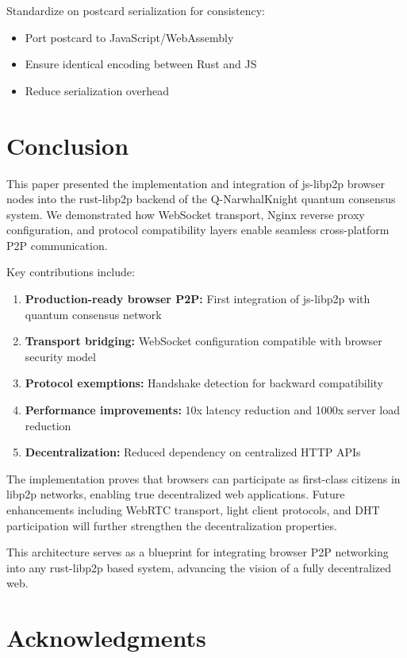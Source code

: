 \documentclass[11pt,a4paper]{article}
\begin{document}
Standardize on postcard serialization for consistency:

\begin{itemize}
    \item Port postcard to JavaScript/WebAssembly
    \item Ensure identical encoding between Rust and JS
    \item Reduce serialization overhead
\end{itemize}

\section{Conclusion}

This paper presented the implementation and integration of js-libp2p browser nodes into the rust-libp2p backend of the Q-NarwhalKnight quantum consensus system. We demonstrated how WebSocket transport, Nginx reverse proxy configuration, and protocol compatibility layers enable seamless cross-platform P2P communication.

Key contributions include:

\begin{enumerate}
    \item \textbf{Production-ready browser P2P:} First integration of js-libp2p with quantum consensus network
    \item \textbf{Transport bridging:} WebSocket configuration compatible with browser security model
    \item \textbf{Protocol exemptions:} Handshake detection for backward compatibility
    \item \textbf{Performance improvements:} 10x latency reduction and 1000x server load reduction
    \item \textbf{Decentralization:} Reduced dependency on centralized HTTP APIs
\end{enumerate}

The implementation proves that browsers can participate as first-class citizens in libp2p networks, enabling true decentralized web applications. Future enhancements including WebRTC transport, light client protocols, and DHT participation will further strengthen the decentralization properties.

This architecture serves as a blueprint for integrating browser P2P networking into any rust-libp2p based system, advancing the vision of a fully decentralized web.

\section*{Acknowledgments}
\end{document}
